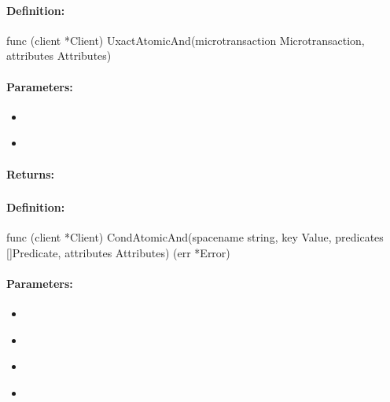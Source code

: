 \paragraph{Definition:}
\begin{gocode}
func (client *Client) UxactAtomicAnd(microtransaction Microtransaction, attributes Attributes)
\end{gocode}

\paragraph{Parameters:}
\begin{itemize}[noitemsep]
\item {}\\

\item {}\\

\end{itemize}

\paragraph{Returns:}


\pagebreak
\subsubsection{}
\label{api:Go:CondAtomicAnd}


\paragraph{Definition:}
\begin{gocode}
func (client *Client) CondAtomicAnd(spacename string, key Value, predicates []Predicate, attributes Attributes) (err *Error)
\end{gocode}

\paragraph{Parameters:}
\begin{itemize}[noitemsep]
\item {}\\

\item {}\\

\item {}\\

\item {}\\

\end{itemize}

